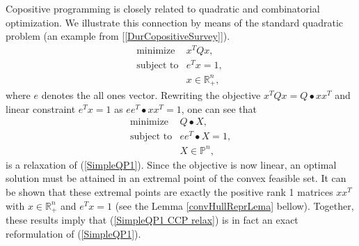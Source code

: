 \documentclass[12pt]{book}
\theoremstyle{definition}
\begin{document}
Copositive programming is closely related to quadratic and combinatorial
optimization. 
We illustrate this connection by means of the standard quadratic
problem (an example from [\ref{DurCopositiveSurvey}]).
\begin{equation}
\label{SimpleQP1}
\begin{array}{ll}
\mbox{minimize} & x^TQx,\\
\mbox{subject to}& e^Tx   = 1, \ \\
& x \in \mathbb{R}^n_+,
\end{array}
\end{equation}
where $e$ denotes the all ones vector. Rewriting the objective $x^TQx = Q\bullet xx^T$ and linear constraint $e^Tx = 1 $ as $ee^T\bullet xx^T = 1$, one can see that  
\begin{equation}
\label{SimpleQP1 CCP relax}
\begin{array}{ll}
\mbox{minimize} & Q\bullet X,\\
\mbox{subject to}& ee^T\bullet X  =1 , \\
& X \in \mathbb{P}^n,
\end{array}
\end{equation}
is a relaxation of (\ref{SimpleQP1}). Since the objective is now linear, an
optimal solution must be attained in an extremal point of the convex feasible
set. It can be shown that these extremal points are exactly the positive rank 1
matrices $xx^T$ with $x\in\mathbb{R}^n_+$ and $e^T x = 1$ (see the Lemma \ref{convHullReprLema} bellow). Together, these results imply that (\ref{SimpleQP1 CCP relax}) is in fact an exact reformulation of (\ref{SimpleQP1}).
\end{document}
